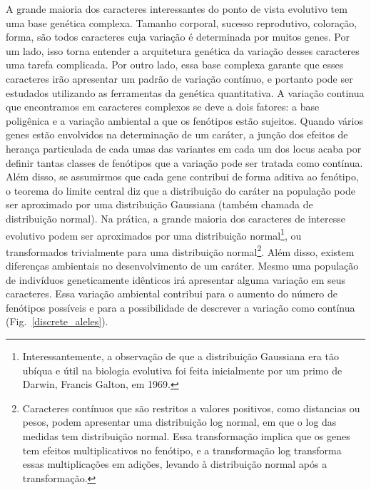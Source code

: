 \begin{refsection}
A grande maioria dos caracteres interessantes do ponto de vista evolutivo tem
uma base genética complexa. Tamanho corporal, sucesso reprodutivo, coloração,
forma, são todos caracteres cuja variação é determinada por muitos genes. Por
um lado, isso torna entender a arquitetura genética da variação desses
caracteres uma tarefa complicada. Por outro lado, essa base complexa garante
que esses caracteres irão apresentar um padrão de variação contínuo, e
portanto pode ser estudados utilizando as ferramentas da genética
quantitativa. A variação continua que encontramos em caracteres complexos se
deve a dois fatores: a base poligênica e a variação ambiental a que os
fenótipos estão sujeitos. Quando vários genes estão envolvidos na determinação
de um caráter, a junção dos efeitos de herança particulada de cada umas das
variantes em cada um dos locus acaba por definir tantas classes de fenótipos
que a variação pode ser tratada como contínua. Além disso, se assumirmos que
cada gene contribui de forma aditiva ao fenótipo, o teorema do limite central
diz que a distribuição do caráter na população pode ser aproximado por uma
distribuição Gaussiana (também chamada de distribuição normal). Na prática, a
grande maioria dos caracteres de interesse evolutivo podem ser aproximados por
uma distribuição normal\footnote{Interessantemente, a observação de que a
distribuição Gaussiana era tão ubíqua e útil na biologia evolutiva foi feita
inicialmente por um primo de Darwin, Francis Galton, em 1969.}, ou
transformados trivialmente para uma distribuição normal\footnote{Caracteres
contínuos que são restritos a valores positivos, como distancias ou pesos,
podem apresentar uma distribuição log normal, em que o log das medidas tem
distribuição normal. Essa transformação implica que os genes tem efeitos
multiplicativos no fenótipo, e a transformação log transforma essas
multiplicações em adições, levando à distribuição normal após a
transformação.}. Além disso, existem diferenças ambientais no desenvolvimento
de um caráter. Mesmo uma população de indivíduos geneticamente idênticos irá
apresentar alguma variação em seus caracteres. Essa variação ambiental
contribui para o aumento do número de fenótipos possíveis e para a
possibilidade de descrever a variação como contínua
(Fig.~\ref{discrete_aleles}).


\end{refsection}
